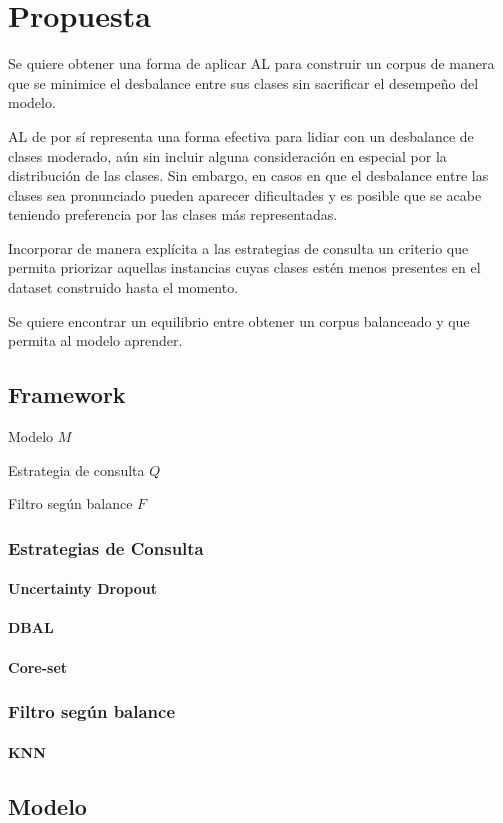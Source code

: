 

\chapter{Propuesta} 

Se quiere obtener una forma de aplicar AL para construir un corpus de manera que se minimice el desbalance entre sus clases sin sacrificar el desempeño del modelo.

AL de por sí representa una forma efectiva para lidiar con un desbalance de clases moderado, aún sin incluir alguna consideración en especial por la distribución de las clases. Sin embargo, en casos en que el desbalance entre las clases sea pronunciado pueden aparecer dificultades y es posible que se acabe teniendo preferencia por las clases más representadas.

Incorporar de manera explícita a las estrategias de consulta un criterio que permita priorizar aquellas instancias cuyas clases estén menos presentes en el dataset construido hasta el momento.

Se quiere encontrar un equilibrio entre obtener un corpus balanceado y que permita al modelo aprender.


\section{Framework}

Modelo $M$

Estrategia de consulta $Q$

Filtro según balance $F$

 

\subsection{Estrategias de Consulta}
\subsubsection{Uncertainty Dropout}
\subsubsection{DBAL}
\subsubsection{Core-set}

\subsection{Filtro según balance}
\subsubsection{KNN}

\section{Modelo}